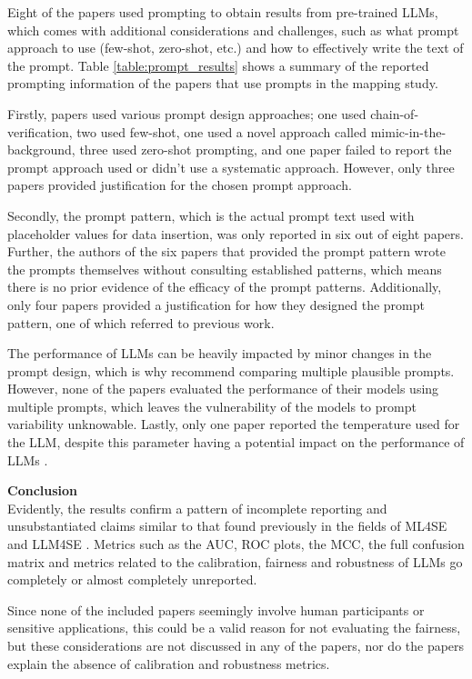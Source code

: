 \documentclass[a4paper]{article}
\begin{document}
Eight of the papers used prompting to obtain results from pre-trained LLMs, which comes with additional considerations and challenges, such as what prompt approach to use (few-shot, zero-shot, etc.) and how to effectively write the text of the prompt. Table \ref{table:prompt_results} shows a summary of the reported prompting information of the papers that use prompts in the mapping study. 

Firstly, papers used various prompt design approaches; one used chain-of-verification, two used few-shot, one used a novel approach called mimic-in-the-background, three used zero-shot prompting, and one paper failed to report the prompt approach used or didn't use a systematic approach. However, only three papers provided justification for the chosen prompt approach. 

Secondly, the prompt pattern, which is the actual prompt text used with placeholder values for data insertion, was only reported in six out of eight papers. Further, the authors of the six papers that provided the prompt pattern wrote the prompts themselves without consulting established patterns, which means there is no prior evidence of the efficacy of the prompt patterns. Additionally, only four papers provided a justification for how they designed the prompt pattern, one of which referred to previous work.

The performance of LLMs can be heavily impacted by minor changes in the prompt design, which is why \textcite{sclar2024quantifyinglanguagemodelssensitivity} recommend comparing multiple plausible prompts. However, none of the papers evaluated the performance of their models using multiple prompts, which leaves the vulnerability of the models to prompt variability unknowable. Lastly, only one paper reported the temperature used for the LLM, despite this parameter having a potential impact on the performance of LLMs \cite{peeperkorn2024}.

\textbf{Conclusion}\\
Evidently, the results confirm a pattern of incomplete reporting and unsubstantiated claims similar to that found previously in the fields of ML4SE \cite{Dellanna2022} and LLM4SE \cite{hou2024}. Metrics such as the AUC, ROC plots, the MCC, the full confusion matrix and metrics related to the calibration, fairness and robustness of LLMs go completely or almost completely unreported.

Since none of the included papers seemingly involve human participants or sensitive applications, this could be a valid reason for not evaluating the fairness, but these considerations are not discussed in any of the papers, nor do the papers explain the absence of calibration and robustness metrics. 
\end{document}
